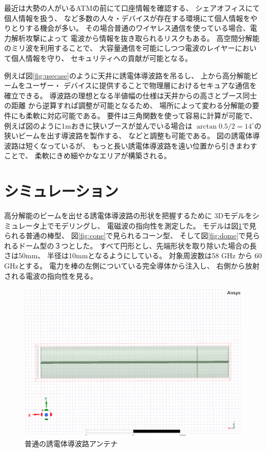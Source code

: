 \documentclass[technicalreport]{ieicej}
\begin{document}
最近は大勢の人がいるATMの前にて口座情報を確認する、
シェアオフィスにて個人情報を扱う、
など多数の人々・デバイスが存在する環境にて個人情報をやりとりする機会が多い。
その場合普通のワイヤレス通信を使っている場合、電力解析攻撃によって
電波から情報を抜き取られるリスクもある。
高空間分解能のミリ波を利用することで、
大容量通信を可能にしつつ電波のレイヤーにおいて個人情報を守り、
セキュリティへの貢献が可能となる。

例えば図\ref{fig:usecase}のように天井に誘電体導波路を吊るし、
上から高分解能ビームをユーザー・
デバイスに提供することで物理層におけるセキュアな通信を確立できる。
導波路の理想となる半値幅の仕様は天井からの高さとブース同士の距離
から逆算すれば調整が可能となるため、
場所によって変わる分解能の要件にも柔軟に対応可能である。
要件は三角関数を使って容易に計算が可能で、
例えば図のように1mおきに狭いブースが並んでいる場合は
$\arctan 0.5 / 2 = 14^{\circ}$の狭いビームを出す導波路を製作する、
などと調整も可能である。
図の誘電体導波路は短くなっているが、
もっと長い誘電体導波路を遠い位置から引きまわすことで、
柔軟にきめ細やかなエリアが構築される。


\section{シミュレーション}

高分解能のビームを出せる誘電体導波路の形状を把握するために
3Dモデルをシミュレータ上でモデリングし、
電磁波の指向性を測定した。
モデルは図\ref{fig:normal}で見られる普通の棒型、
図\ref{fig:cone}で見られるコーン型、
そして図\ref{fig:dome}で見られるドーム型の３つとした。
すべて円形とし、先端形状を取り除いた場合の長さは50mm、
半径は10mmとなるようにしている。
対象周波数は58 GHz から 60 GHzとする。
電力を棒の左側についている完全導体から注入し、
右側から放射される電波の指向性を見る。

\begin{figure}[tb]
  \begin{center}
    \includegraphics[bb=0 0 384 262, width=0.7\linewidth]{img/normal.pdf}
    \caption{普通の誘電体導波路アンテナ}
    \label{fig:normal}
  \end{center}
\end{figure}
\end{document}
